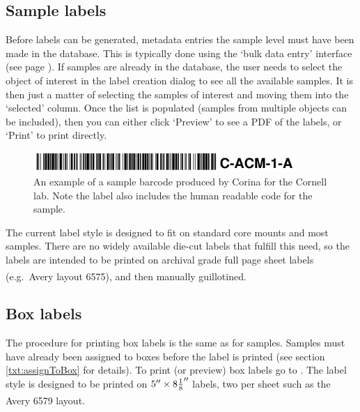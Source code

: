 \subsection{Sample labels}
Before labels can be generated, metadata entries the sample level must have been made in the database.  This is typically done using the `bulk data entry' interface (see page \pageref{txt:bulkentry}).  If samples are already in the database, the user needs to select the object of interest in the label creation dialog to see all the available samples.  It is then just a matter of selecting the samples of interest and moving them into the `selected' column.  Once the list is populated (samples from multiple objects can be included), then you can either click `Preview' to see a PDF of the labels, or `Print' to print directly.

\begin{figure}[hbtp]
  \centering
    \includegraphics[width=100mm]{Images/samplebarcode.png}
    \caption{An example of a sample barcode produced by Corina for the Cornell lab.  Note the label also includes the human readable code for the sample.}
    \label{fig:graph}
\end{figure}

The current label style is designed to fit on standard core mounts and most samples.  There are no widely available die-cut labels that fulfill this need, so the labels are intended to be printed on archival grade full page sheet labels (e.g.\ Avery\textsuperscript{\textregistered} layout 6575), and then manually guillotined.  

\subsection{Box labels}
The procedure for printing box labels is the same as for samples.  Samples must have already been assigned to boxes before the label is printed (see section \ref{txt:assignToBox} for details).  To print (or preview) box labels go to .  The label style is designed to be printed on $5'' \times 8{1 \over 8}''$ labels, two per sheet such as the Avery\textsuperscript{\textregistered} 6579 layout.


